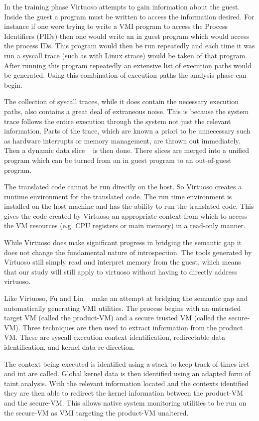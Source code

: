 In the training phase Virtuoso attempts to gain information about the guest. Inside the guest a program must be written to access the information desired. For instance if one were trying to write a VMI program to access the Process Identifiers (PIDs) then one would write an in guest program which would access the process IDs. This program would then be run repeatedly and each time it was run a syscall trace (such as with Linux strace) would be taken of that program.  After running this program repeatedly an extensive list of execution paths would be generated. Using this combination of execution paths the analysis phase can begin. 

The collection of syscall traces, while it does contain the necessary execution paths, also contains a great deal of extraneous noise. This is because the system trace follows the entire execution through the system not just the relevant information. Parts of the trace, which are known a priori to be unnecessary such as hardware interrupts or memory management, are thrown out immediately. Then a dynamic data slice ~\cite{agrawal_dynamic_1990} is then done. There slices are merged into a unified program which can be turned from an in guest program to an out-of-guest program. 

The translated code cannot be run directly on the host. So Virtuoso creates a runtime environment for the translated code. The run time environment is installed on the host machine and has the ability to run the translated code. This gives the code created by Virtuoso an appropriate context from which to access the VM resources (e.g. CPU registers or main memory) in a read-only manner.

While Virtuoso does make significant progress in bridging the semantic gap it does not change the fundamental nature of introspection. The tools generated by Virtuoso still simply read and interpret memory from the guest, which means that our study will still apply to virtuoso without having to directly address virtuoso. 


Like Virtuoso, Fu and Lin ~\cite{fu_bridging_2013} make an attempt at bridging the semantic gap and automatically generating VMI utilities.  The process begins with an untrusted target VM (called the product-VM) and a secure trusted VM (called the secure-VM). Three techniques are then used to extract information from the product VM. These are syscall execution context identification, redirectable data identification, and kernel data re-direction. 

The context being executed is identified using a stack to keep track of times iret  and int are called. Global kernel data is then identified using an adapted form of taint analysis. With the relevant information located and the contexts identified they are then able to redirect the kernel information between the product-VM and the secure-VM. This allows native system monitoring utilities to be run on the secure-VM as VMI targeting the product-VM unaltered. 

